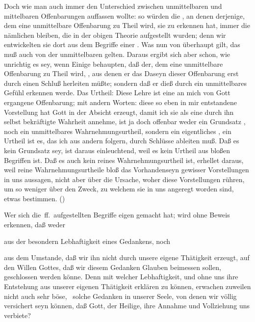 \begin{aufza}
\item Doch wie man auch immer den Unterschied zwischen unmittelbaren und mittelbaren Offenbarungen auffassen wollte: so würden die , an denen derjenige, dem eine unmittelbare Offenbarung zu Theil wird, sie zu erkennen hat, immer die nämlichen bleiben, die in der obigen Theorie aufgestellt wurden; denn wir entwickelten sie dort aus dem Begriffe einer . Was nun von  überhaupt gilt, das muß auch von der unmittelbaren gelten. Daraus ergibt sich aber schon, wie unrichtig es sey, wenn Einige behaupten, daß der, dem eine unmittelbare Offenbarung zu Theil wird, , aus denen er das Daseyn dieser Offenbarung erst durch einen Schluß herleiten müßte; sondern daß er dieß durch ein unmittelbares Gefühl erkennen werde. Das Urtheil: Diese Lehre ist eine an mich von Gott ergangene Offenbarung; mit andern Worten: diese so eben in mir entstandene Vorstellung hat Gott in der Absicht erzeugt, damit ich sie als eine durch ihn selbst bekräftigte Wahrheit annehme, ist ja doch offenbar weder ein Grundsatz , noch ein unmittelbares Wahrnehmungsurtheil, sondern ein eigentliches , ein Urtheil ist es, das ich aus andern folgern, durch Schlüsse ableiten muß. Daß es kein Grundsatz  sey, ist daraus einleuchtend, weil es kein Urtheil aus bloßen Begriffen ist. Daß es auch kein reines Wahrnehmungsurtheil ist, erhellet daraus, weil reine Wahrnehmungsurtheile bloß das Vorhandenseyn gewisser Vorstellungen in uns aussagen, nicht aber über die Ursache, woher diese Vorstellungen rühren, um so weniger über den Zweck, zu welchem sie in uns angeregt worden sind, etwas bestimmen. ()~
\item Wer sich die \,ff.\ aufgestellten Begriffe eigen gemacht hat; wird ohne Beweis erkennen, daß weder
\begin{aufzb}
\item aus der besondern Lebhaftigkeit eines Gedankens, noch
\item aus dem Umstande, daß wir ihn nicht durch unsere eigene Thätigkeit erzeugt, auf den Willen Gottes, daß wir diesem Gedanken Glauben beimessen sollen, geschlossen werden könne. Denn mit welcher Lebhaftigkeit, und ohne uns ihre Entstehung aus unserer eigenen Thätigkeit erklären zu können, erwachen zuweilen nicht auch sehr böse, \dh\ solche Gedanken in unserer Seele, von denen wir völlig versichert seyn können, daß Gott, der Heilige, ihre Annahme und Vollziehung uns verbiete?

\end{aufzb}
\end{aufza}
